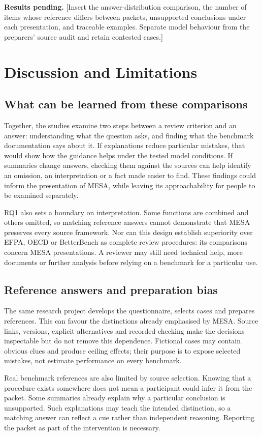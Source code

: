 \documentclass[10pt,conference]{IEEEtran}
\begin{document}
\textbf{Results pending.} [Insert the answer-distribution comparison, the number of items whose reference differs between packets, unsupported conclusions under each presentation, and traceable examples. Separate model behaviour from the preparers' source audit and retain contested cases.]

\section{Discussion and Limitations}
\subsection{What can be learned from these comparisons}
Together, the studies examine two steps between a review criterion and an answer: understanding what the question asks, and finding what the benchmark documentation says about it. If explanations reduce particular mistakes, that would show how the guidance helps under the tested model conditions. If summaries change answers, checking them against the sources can help identify an omission, an interpretation or a fact made easier to find. These findings could inform the presentation of MESA, while leaving its approachability for people to be examined separately.

RQ1 also sets a boundary on interpretation. Some functions are combined and others omitted, so matching reference answers cannot demonstrate that MESA preserves every source framework. Nor can this design establish superiority over EFPA, OECD or BetterBench as complete review procedures: its comparisons concern MESA presentations. A reviewer may still need technical help, more documents or further analysis before relying on a benchmark for a particular use.

\subsection{Reference answers and preparation bias}
The same research project develops the questionnaire, selects cases and prepares references. This can favour the distinctions already emphasised by MESA. Source links, versions, explicit alternatives and recorded checking make the decisions inspectable but do not remove this dependence. Fictional cases may contain obvious clues and produce ceiling effects; their purpose is to expose selected mistakes, not estimate performance on every benchmark.

Real benchmark references are also limited by source selection. Knowing that a procedure exists somewhere does not mean a participant could infer it from the packet. Some summaries already explain why a particular conclusion is unsupported. Such explanations may teach the intended distinction, so a matching answer can reflect a cue rather than independent reasoning. Reporting the packet as part of the intervention is necessary.
\end{document}
